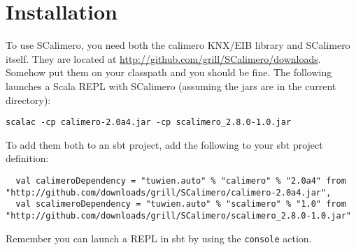 \chapter{Installation}

To use SCalimero, you need both the calimero KNX/EIB library and SCalimero itself. They are located at \url{http://github.com/grill/SCalimero/downloads}. Somehow put them on your classpath and you should be fine. The following launches a Scala REPL with SCalimero (assuming the jars are in the current directory):
\begin{lstlisting}
scalac -cp calimero-2.0a4.jar -cp scalimero_2.8.0-1.0.jar
\end{lstlisting}

To add them both to an sbt project, add the following to your sbt project definition:
\begin{lstlisting}
  val calimeroDependency = "tuwien.auto" % "calimero" % "2.0a4" from "http://github.com/downloads/grill/SCalimero/calimero-2.0a4.jar",
  val scalimeroDependency = "tuwien.auto" % "scalimero" % "1.0" from "http://github.com/downloads/grill/SCalimero/scalimero_2.8.0-1.0.jar"
\end{lstlisting}

Remember you can launch a REPL in sbt by using the \lstinline!console! action.
